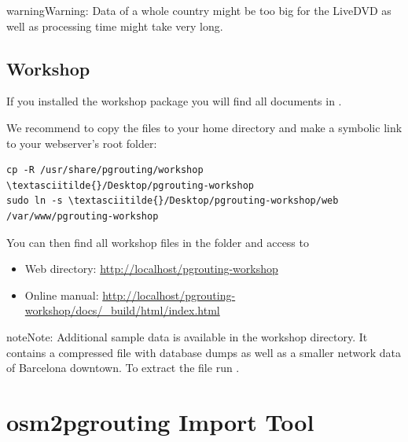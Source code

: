 \documentclass[a4paper,10pt,english]{manual}
\begin{document}
\begin{notice}{warning}{Warning:}
Data of a whole country might be too big for the LiveDVD as well as processing time might take very long.
\end{notice}


\section{Workshop}

If you installed the workshop package you will find all documents in .

We recommend to copy the files to your home directory and make a symbolic link to your webserver's root folder:

\begin{Verbatim}[commandchars=\\\{\}]
cp -R /usr/share/pgrouting/workshop \textasciitilde{}/Desktop/pgrouting-workshop
sudo ln -s \textasciitilde{}/Desktop/pgrouting-workshop/web /var/www/pgrouting-workshop
\end{Verbatim}

You can then find all workshop files in the  folder and access to
\begin{itemize}
\item {} 
Web directory: \href{http://localhost/pgrouting-workshop}{http://localhost/pgrouting-workshop}

\item {} 
Online manual: \href{http://localhost/pgrouting-workshop/docs/\_build/html/index.html}{http://localhost/pgrouting-workshop/docs/\_build/html/index.html}

\end{itemize}

\begin{notice}{note}{Note:}
Additional sample data is available in the workshop  directory. It contains a compressed file with database dumps as well as a smaller network data of Barcelona downtown. To extract the file run .
\end{notice}

\resetcurrentobjects
\hypertarget{--doc-chapters/osm2pgrouting}{}

\chapter{osm2pgrouting Import Tool}
\end{document}
